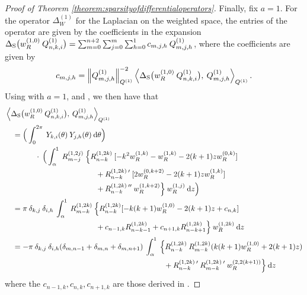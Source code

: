 \documentclass[11pt, oneside]{article}   	%
\begin{document}
\begin{proof}[Proof of Theorem \ref{theorem:sparsityofdifferentialoperators}]
Finally, fix $a = 1$. For the operator $\Delta^{(1)}_W$ for the Laplacian on the weighted space, the entries of the operator are given by the coefficients in the expansion $\Delta_{\rm S} \big(w_R^{(1,0)} \: Q_{n,k,i}^{(1)} \big) = \sum_{m=0}^{n+2} \sum_{j=0}^m \sum_{h=0}^1 c_{m,j,h} \: Q_{m,j,h}^{(1)}$, where the coefficients are given by
\begin{align*}
	c_{m,j,h} = \norm{\scopmjh^{(1)}}^{-2}_{\scop^{(1)}} \ip<\DeltaS \big(\genjacw^{(1,0)} \: \scopnki^{(1)} \big), \: \scopmjh^{(1)}>_{\scop^{(1)}}.
\end{align*}
Using  with $a = 1$, and , we then have that
\begin{align*}
	&\ip<\DeltaS \big(\genjacw^{(1,0)} \: \scopnki^{(1)} \big), \: \scopmjh^{(1)}>_{\scop^{(1)}} \\
	&\quad = \Big( \int_0^{2\pi} \: \chki(\theta) \: \chjh(\theta) \: \D \theta \Big) \\
	&\quad \quad \quad \quad \cdot \: \Big( \int_\alpha^1 \: \genjacmmj^{(1,2j)} \: \Big\{ \genjacnmk^{(1, 2k)} \: [- k^2 \genjacw^{(1, k)} - \genjacw^{(1, k)} - 2(k + 1)z \genjacw^{(0, k)}] \\
	&\quad \quad \quad \quad \quad \quad \quad \quad \quad \quad \quad \quad + \genjacnmk^{(1, 2k) \: \prime} \: [2 \genjacw^{(0, k+2)} - 2(k + 1)z \genjacw^{(1, k)}] \\
	&\quad \quad \quad \quad \quad \quad \quad \quad \quad \quad \quad \quad + \genjacnmk^{(1, 2k) \: \prime \prime} \: \genjacw^{(1, k+2)} \Big\} \: \genjacw^{(1, j)} \: \D z \Big) \\
	&\quad = \pi \: \delta_{k,j} \: \delta_{i,h} \: \int_\alpha^1 \: \genjac_{m-k}^{(1,2k)} \: \Big\{ \genjacnmk^{(1, 2k)} [-k(k+1) \genjacw^{(1, 0)} - 2(k+1)z + c_{n,k}] \\
	&\quad \quad \quad \quad \quad \quad \quad \quad \quad \quad \quad \quad + c_{n-1,k} \genjac_{n-k-1}^{(1, 2k)} + c_{n+1,k} \genjac_{n-k+1}^{(1, 2k)} \Big\} \: \genjacw^{(1, 2k)} \: \D z \\
	&\quad = - \pi \: \delta_{k,j} \: \delta_{i,h} (\delta_{m,n-1} + \delta_{m,n} + \delta_{m,n+1}) \: \int_\alpha^1 \: \Big\{ \genjacnmk^{(1,2k)} \: \genjac_{m-k}^{(1, 2k)} (k(k+1) \genjacw^{(1, 0)} + 2(k+1)z) \\ 
	&\quad \quad \quad \quad \quad \quad \quad \quad \quad \quad \quad \quad \quad \quad \quad \quad \quad \quad \quad \quad \quad + \genjacnmk^{(1,2k) \: \prime} \: \genjac_{m-k}^{(1,2k) \: \prime} \: \genjacw^{(2, 2(k+1))} \Big\} \: \D z
\end{align*}
where the $c_{n-1,k}, c_{n,k}, c_{n+1,k}$ are those derived in .
\end{proof}
\end{document}
